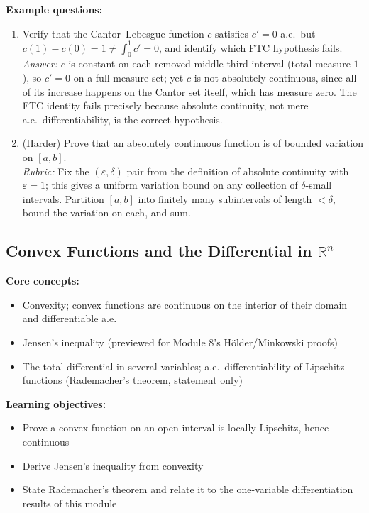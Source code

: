 \documentclass[11pt]{article}
\begin{document}
\textbf{Example questions:}
\begin{enumerate}[nosep]
\item Verify that the Cantor--Lebesgue function $c$ satisfies $c'=0$ a.e.\ but $c(1)-c(0)=1\ne\int_0^1 c'=0$, and identify which FTC hypothesis fails. \\
\textit{Answer:} $c$ is constant on each removed middle-third interval (total measure $1$), so $c'=0$ on a full-measure set; yet $c$ is not absolutely continuous, since all of its increase happens on the Cantor set itself, which has measure zero. The FTC identity fails precisely because absolute continuity, not mere a.e.\ differentiability, is the correct hypothesis.
\item (Harder) Prove that an absolutely continuous function is of bounded variation on $[a,b]$. \\
\textit{Rubric:} Fix the $(\varepsilon,\delta)$ pair from the definition of absolute continuity with $\varepsilon=1$; this gives a uniform variation bound on any collection of $\delta$-small intervals. Partition $[a,b]$ into finitely many subintervals of length $<\delta$, bound the variation on each, and sum.
\end{enumerate}

\subsection{Convex Functions and the Differential in $\mathbb{R}^n$}

\textbf{Core concepts:}
\begin{itemize}[nosep]
\item Convexity; convex functions are continuous on the interior of their domain and differentiable a.e.
\item Jensen's inequality (previewed for Module 8's H\"older/Minkowski proofs)
\item The total differential in several variables; a.e.\ differentiability of Lipschitz functions (Rademacher's theorem, statement only)
\end{itemize}

\textbf{Learning objectives:}
\begin{itemize}[nosep]
\item Prove a convex function on an open interval is locally Lipschitz, hence continuous
\item Derive Jensen's inequality from convexity
\item State Rademacher's theorem and relate it to the one-variable differentiation results of this module
\end{itemize}
\end{document}
